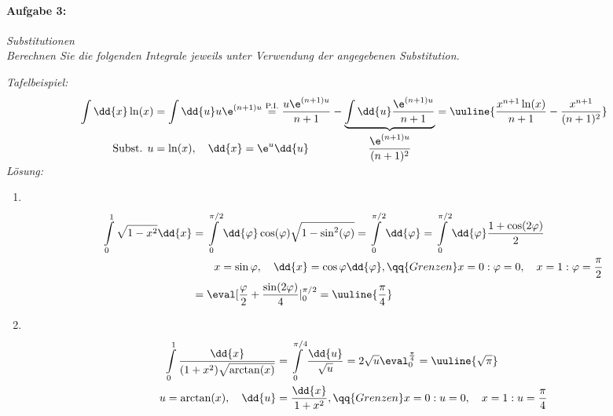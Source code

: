 \paragraph{Aufgabe 3: } \emph{Substitutionen}\\[0.2cm]
\emph{Berechnen Sie die folgenden Integrale jeweils unter Verwendung der angegebenen Substitution.}

\emph{Tafelbeispiel:}
\begin{align}
    \int \dd{x} \ln(x) &= \int \dd{u} u \e^{(n+1)u} \overset{\text{P.I.}}{=} \frac{u \e^{(n+1)u}}{n+1} - \underbrace{\int \dd{u} \frac{\e^{(n+1)u}}{n+1}}_{\displaystyle\frac{\e^{(n+1)u}}{(n+1)^2}}= \uuline{\frac{x^{n+1} \ln(x)}{n+1} - \frac{x^{n+1}}{(n+1)^2}} \\[-8mm]
    \text{Subst. } u&= \ln(x), \quad \dd{x} = \e^u \dd{u} 
\end{align}
\emph{Lösung:}
\begin{enumerate}[label=(\alph*)]
    \setlength{\mathindent}{0pt}
    \item$~$\\[-1.7cm]
    \begin{align}
        \int\limits_{0}^{1} \sqrt{1-x^2} \dd{x} &= \int\limits_{0}^{\pi/2} \dd{\varphi} \cos(\varphi) \sqrt{1-\sin^2(\varphi)} = \int\limits_{0}^{\pi/2} \dd{\varphi} = \int\limits_{0}^{\pi/2}\dd{\varphi} \frac{1+\cos(2\varphi)}{2} \notag \\
        &\qquad x = \sin\varphi,\quad \dd{x} = \cos\varphi \dd{\varphi}, \qq{Grenzen} x=0: \varphi=0, \quad x=1: \varphi = \frac{\pi}{2} \\
        &= \eval[\frac{\varphi}{2} + \frac{\sin(2\varphi)}{4}|_0^{\pi/2} = \uuline{\frac{\pi}{4}}
    \end{align}
    \item$~$\\[-1.7cm]
    \begin{align}
        \int\limits_0^1 \frac{\dd{x}}{(1+x^2)\sqrt{\arctan(x)}} &= \int\limits_{0}^{\pi/4} \frac{\dd{u}}{\sqrt{u}} = 2 \sqrt{u} \eval_0^{\frac{\pi}{4}} = \uuline{\sqrt{\pi}} \\
        u = \arctan(x), \quad \dd{u} &= \frac{\dd{x}}{1+x^2}, \qq{Grenzen} x=0: u=0, \quad x=1: u=\frac{\pi}{4}
    \end{align}
\end{enumerate}

